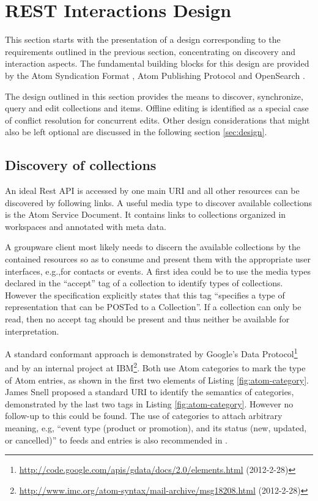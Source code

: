 \documentclass[11pt,a4paper,headsepline,twoside]{scrartcl}		%
\newcommand{\citeurl}[2]{\url{#1} (#2)}
\begin{document}
\section{REST Interactions Design}
\label{sec:interactions}

This section starts with the presentation of a design corresponding to the
requirements outlined in the previous section, concentrating on discovery and
interaction aspects. The fundamental building blocks for this design are
provided by the Atom Syndication Format \cite{RFC4287}, Atom Publishing Protocol
\cite{RFC5023} and OpenSearch \cite{Clinton}.

The design outlined in this section provides the means to discover, synchronize,
query and edit collections and items. Offline editing is identified as a special
case of conflict resolution for concurrent edits. Other design considerations
that might also be left optional are discussed in the following section
\ref{sec:design}.

\subsection{Discovery of collections}
\label{sec:disc-coll}

An ideal Rest API is accessed by one main URI and all other resources can be
discovered by following links. A useful media type to discover available
collections is the Atom Service Document\cite[sec. 8]{RFC5023}. It contains
links to collections organized in workspaces and annotated with meta data.

A groupware client most likely needs to discern the available collections by the
contained resources so as to consume and present them with the appropriate user
interfaces, e.g.,for contacts or events. A first idea could be to use the
media types declared in the ``accept'' tag of a collection to identify types of
collections. However the specification explicitly states that this tag
``specifies a type of representation that can be POSTed to a
Collection''\cite[sec. 8.3.4]{RFC5023}. If a collection can only be read, then
no accept tag should be present and thus neither be available for
interpretation.

A standard conformant approach is demonstrated by Google's Data
Protocol\footnote{\citeurl{http://code.google.com/apis/gdata/docs/2.0/elements.html}{2012-2-28}}
and by an internal project at
IBM\footnote{\label{snellatomcategory}\citeurl{http://www.imc.org/atom-syntax/mail-archive/msg18208.html}{2012-2-28}}. Both
use Atom categories\cite[sec. 8.3.6]{RFC5023} to mark the type of Atom entries,
as shown in the first two elements of Listing \ref{fig:atom-category}. James
Snell proposed a standard URI to identify the semantics of
categories, demonstrated by the last two tags in
Listing \ref{fig:atom-category}. However no follow-up to this could be
found. The use of categories to attach arbitrary meaning, e.g, ``event type
(product or promotion), and its status (new, updated, or cancelled)'' to feeds
and entries is also recommended in \cite[p. 200]{Webber2010}.
\end{document}

